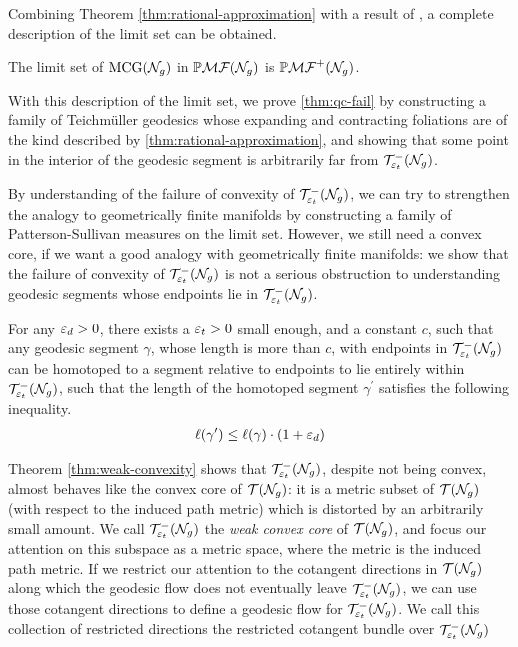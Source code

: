 Combining Theorem \ref{thm:rational-approximation} with a result of \textcite[Proposition 1]{lenzhen2010criteria}, a complete description of the limit set can be obtained.
\begin{theorem}
  The limit set of $\mathrm{MCG}(\mathcal{N}_g)$ in $\mathbb{P}\mathcal{MF}(\mathcal{N}_g)$ is $\mathbb{P}\mathcal{MF}^+(\mathcal{N}_g)$.
\end{theorem}

With this description of the limit set, we prove \autoref{thm:qc-fail} by constructing a family of Teichmüller geodesics whose expanding and contracting foliations are of the kind described by \autoref{thm:rational-approximation}, and showing that some point in the interior of the geodesic segment is arbitrarily far from $\mathcal{T}_{\varepsilon_t}^{-}(\mathcal{N}_g)$.

By understanding of the failure of convexity of $\mathcal{T}_{\varepsilon_t}^{-}(\mathcal{N}_g)$, we can try to strengthen the analogy to geometrically finite manifolds by constructing a family of Patterson-Sullivan measures on the limit set.
However, we still need a convex core, if we want a good analogy with geometrically finite manifolds: we show that the failure of convexity of $\mathcal{T}_{\varepsilon_t}^{-}(\mathcal{N}_g)$ is not a serious obstruction to understanding geodesic segments whose endpoints lie in $\mathcal{T}_{\varepsilon_t}^{-}(\mathcal{N}_g)$.


\begingroup
\def\thetheorem{\ref{thm:weak-convexity}}
\begin{theorem}
  For any $\varepsilon_d > 0$, there exists a $\varepsilon_t > 0$ small enough, and a constant $c$, such that any geodesic segment $\gamma$, whose length is more than $c$, with endpoints in $\mathcal{T}_{\varepsilon_t}^{-}(\mathcal{N}_g)$ can be homotoped to a segment relative to endpoints to lie entirely within $\mathcal{T}_{\varepsilon_t}^{-}(\mathcal{N}_g)$, such that the length of the homotoped segment $\gamma^{\prime}$ satisfies the following inequality.
  \begin{align*}
    \ell(\gamma^{\prime}) \leq \ell(\gamma) \cdot (1 + \varepsilon_d)
  \end{align*}
\end{theorem}
\addtocounter{theorem}{-1}
\endgroup

Theorem \ref{thm:weak-convexity} shows that $\mathcal{T}_{\varepsilon_t}^{-}(\mathcal{N}_g)$, despite not being convex, almost behaves like the convex core of $\mathcal{T}(\mathcal{N}_g)$: it is a metric subset of $\mathcal{T}(\mathcal{N}_g)$ (with respect to the induced path metric) which is distorted by an arbitrarily small amount.
We call $\mathcal{T}_{\varepsilon_t}^{-}(\mathcal{N}_g)$ the \emph{weak convex core} of $\mathcal{T}(\mathcal{N}_g)$, and focus our attention on this subspace as a metric space, where the metric is the induced path metric.
If we restrict our attention to the cotangent directions in $\mathcal{T}(\mathcal{N}_g)$ along which the geodesic flow does not eventually leave $\mathcal{T}_{\varepsilon_t}^{-}(\mathcal{N}_g)$, we can use those cotangent directions to define a geodesic flow for $\mathcal{T}_{\varepsilon_t}^{-}(\mathcal{N}_g)$.
We call this collection of restricted directions the restricted cotangent bundle over $\mathcal{T}_{\varepsilon_t}^{-}(\mathcal{N}_g)$

